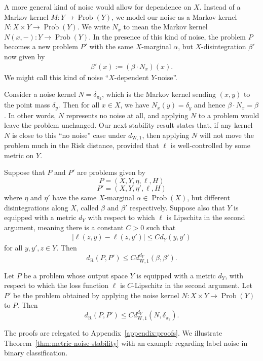 \documentclass[twoside,11pt]{article}
\DeclareMathOperator{\prob}{Prob}
\newcommand{\dexp}[1][]{d_{\mathrm{R}#1}}
\newcommand{\dWkernp}[1]{d_{\mathrm{W},#1}}
\newcommand{\dWkern}{\dWkernp{1}}
\begin{document}
    A more general kind of noise would allow for dependence on $X$. Instead of a Markov kernel $M:Y\to \prob(Y)$, we model our noise as a Markov kernel $N:X\times Y \to \prob(Y)$. We write $N_x$ to mean the Markov kernel $N(x,-): Y\to \prob(Y)$. In the presence of this kind of noise, the problem $P$ becomes a new problem $P'$ with the same $X$-marginal $\alpha$, but $X$-disintegration $\beta'$ now given by
    \begin{align*}
        \beta'(x):=(\beta \cdot N_x)(x).
    \end{align*}
    We might call this kind of noise ``$X$-dependent $Y$-noise''.
    
    Consider a noise kernel $N = \delta_{\pi_2}$, which is the Markov kernel sending $(x,y)$ to the point mass $\delta_y$. Then for all $x\in X$, we have $N_x(y) = \delta_y$ and hence $\beta \cdot N_x = \beta$. In other words, $N$ represents no noise at all, and applying $N$ to a problem would leave the problem unchanged. Our next stability result states that, if any kernel $N$ is close to this ``no noise'' case under $\dWkern$, then applying $N$ will not move the problem much in the Risk distance, provided that $\ell$ is well-controlled by some metric on $Y$.

    \begin{lemma}\label{lem:disintegration-bound}
    Suppose that $P$ and $P'$ are problems given by
    \[P = (X,Y,\eta,\ell,H)\]
    \[P' = (X,Y,\eta',\ell,H)\]
    where $\eta$ and $\eta'$ have the same $X$-marginal $\alpha \in \prob(X)$, but different disintegrations along $X$, called $\beta$ and $\beta'$ respectively. Suppose also that $Y$ is equipped with a metric $d_Y$ with respect to which $\ell$ is Lipschitz in the second argument, meaning there is a constant $C>0$ such that
    \begin{align*}
        \big| \ell(z,y) - \ell(z,y') \big| \leq C d_Y(y,y')
    \end{align*}
    for all $y,y',z\in Y$. Then
    \[\dexp(P,P') \leq C\dWkern^{d_Y}(\beta,\beta').\]
    \end{lemma}
    \begin{theorem}\label{thm:metric-noise-stability}
        Let $P$ be a problem whose output space $Y$ is equipped with a metric $d_Y$, with respect to which the loss function $\ell$ is $C$-Lipschitz in the second argument. Let $P'$ be the problem obtained by applying the noise kernel $N:X\times Y \to \prob(Y)$ to $P$. Then
        \[\dexp(P,P') \leq C \dWkern^{d_Y}(N,\delta_{\pi_2}).\]
    \end{theorem}
    The proofs are relegated to Appendix~\ref{appendix:proofs}.
    We illustrate Theorem~\ref{thm:metric-noise-stability} with an example regarding label noise in binary classification.
\end{document}

